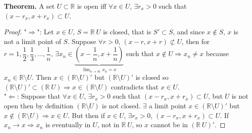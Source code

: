 \documentclass[10pt,letterpaper]{article}
\begin{document}
	\textbf{Theorem. } A set $U \subset \mathbb{R}$ is open iff $\forall x \in U$, $\exists r_x > 0$
	such that $(x - r_x, x + r_x) \subset U$. 
	\begin{proof}
	"$\Rightarrow$": Let $x \in U$, $S = \mathbb{R} \ U$ is closed, that is $S' \subset S$, and since
	$x \not\in S$, $x$ is not a limit point of $S$. Suppose $\forall r > 0$, $(x - r, x + r) \not\subset U$,
	then for $r = 1, \dfrac{1}{2}, \dfrac{1}{3}, \ldots, \dfrac{1}{n}$, $\exists x_n \in 
	\underbrace{(x - \dfrac{1}{n}, x + \dfrac{1}{n})}_{
	\displaystyle\lim_{n\to\infty}x_n = x}$ such that $x \not\in U \Rightarrow x_n \neq x$ because $x_n \in 
	\mathbb{R} \setminus U$. Then $x \in (\mathbb{R} \setminus U)'$ but $(\mathbb{R} \setminus U)'$ is closed
	so $(\mathbb{R} \setminus U)' \subset (\mathbb{R} \ U) \Rightarrow x \in (\mathbb{R} \setminus U)$ contradicts
	that $x \in U$. \\
	"$\Leftarrow$: Suppose that $\forall x \in U$, $\exists r_x > 0$ such that $(x - r_x, x + r_x) \subset U$,
	but $U$ is not open then by definition $(\mathbb{R} \setminus U)$ is not closed. $\exists$ a limit point 
	$x \in (\mathbb{R} \setminus U)'$ but $x \not\in (\mathbb{R} \setminus U) \Rightarrow x \in U$. But then
	if $x \in U$, $\exists r_x > 0$, $(x - r_x, x + r_x) \subset U$. If $x_n \rightarrow x \Rightarrow
	x_n$ is eventually in $U$, not in $\mathbb{R} \ U$, so $x$ cannot be in $(\mathbb{R} \ U)'$.
	\end{proof}
	
\end{document}
